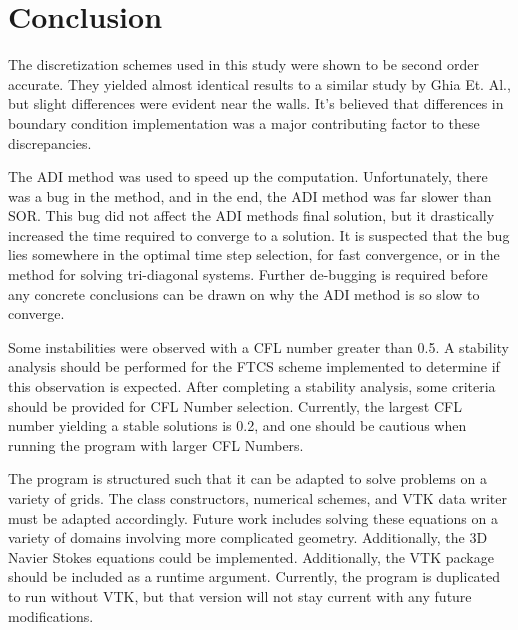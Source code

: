 \chapter{Conclusion}


The discretization schemes used in this study were shown to be second order accurate.  They yielded almost identical results to a similar study by Ghia Et. Al., but slight differences were evident near the walls.  It's believed that differences in boundary condition implementation was a major contributing factor to these discrepancies. 

The ADI method was used to speed up the computation.  Unfortunately, there was a bug in the method, and in the end, the ADI method was far slower than SOR.  This bug did not affect the ADI methods final solution, but it drastically increased the time required to converge to a solution.  It is suspected that the bug lies somewhere in the optimal time step selection, for fast convergence, or in the method for solving tri-diagonal systems.  Further de-bugging is required before any concrete conclusions can be drawn on why the ADI method is so slow to converge.

Some instabilities were observed with a CFL number greater than 0.5.  A stability analysis should be performed for the FTCS scheme implemented to determine if this observation is expected.  After completing a stability analysis, some criteria should be provided for CFL Number selection.  Currently, the largest CFL number yielding a stable solutions is 0.2, and one should be cautious when running the program with larger CFL Numbers.

The program is structured such that it can be adapted to solve problems on a variety of grids.  The class constructors, numerical schemes, and VTK data writer must be adapted accordingly.  Future work includes solving these equations on a variety of domains involving more complicated geometry.  Additionally, the 3D Navier Stokes equations could be implemented.  Additionally, the VTK package should be included as a runtime argument.  Currently, the program is duplicated to run without VTK, but that version will not stay current with any future modifications.